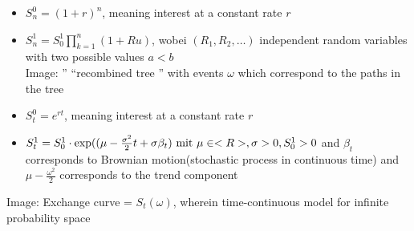 \begin{*example}
	\begin{itemize}
		\item $S^0_n = (1+r)^n$, meaning interest at a constant rate $r$
		\item $S^1_n = S_0^1 \prod_{k=1}^n(1+Ru)$, wobei $(R_1, R_2, \dots)$ independent random variables with two possible values $a < b$\\
		Image: '' ``recombined tree '' with events $\omega$ which correspond to the paths in the tree
	\end{itemize}
\end{*example}
\begin{*example}
	\begin{itemize}
		\item $S^0_t = e^{rt}$,  meaning interest at a constant rate $r$
		\item $S_t^1 = S_0^1\cdot \exp((\mu - \frac{\sigma^2}{2}t + \sigma\beta_t) \text{ mit } \mu \in <R>, \sigma > 0, S^1_0 >0$ and $\beta_t$ corresponds to Brownian motion(stochastic process in continuous time) and $\mu - \frac{\omega^2}{2}$ corresponds to the trend component
	\end{itemize}
	Image: Exchange curve = $S_t(\omega)$, wherein time-continuous model for infinite probability space
\end{*example}
